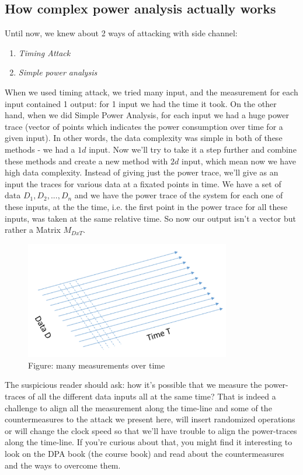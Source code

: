 \subsection{How complex power analysis actually works}
Until now, we knew about 2 ways of attacking with side channel:
\begin{enumerate}
\item \textit{Timing Attack}
\item \textit{Simple power analysis}
\end{enumerate}
When we used timing attack, we tried many input, and the measurement for each input contained 1 output: for 1 input we had the time it took.
On the other hand, when we did Simple Power Analysis, for each input we had a huge power trace (vector of points which indicates the power consumption over time for a given input).
In other words, the data complexity was simple in both of these methods - we had a \(1d\) input.
Now we'll try to take it a step further and combine these methods and create a new method with \(2d\) input, which mean now we have high data complexity.
Instead of giving just the power trace, we'll give as an input the traces for various data at a fixated points in time. We have a set of data \({D_1, D_2, ..., D_n}\) and we have the power trace of the system for each one of these inputs, at the the time, i.e. the first point in the power trace for all these inputs, was taken at the same relative time.
So now our output isn't a vector but rather a Matrix \(M_{DxT}\).
\begin{figure}[H]
\centering
\includegraphics[width=0.8\textwidth]{images/Lecture6/DPA_Illustration.png}
\caption{Figure: many measurements over time}
\label{fig:DPA_Illustration}
\end{figure}

The suspicious reader should ask: how it's possible that we measure the power-traces of all the different data inputs all at the same time? That is indeed a challenge to align all the measurement along the time-line and some of the countermeasures to the attack we present here, will insert randomized operations or will change the clock speed so that we'll have trouble to align the power-traces along the time-line. If you're curious about that, you might find it interesting to look on the DPA book (the course book) and read about the countermeasures and the ways to overcome them.
